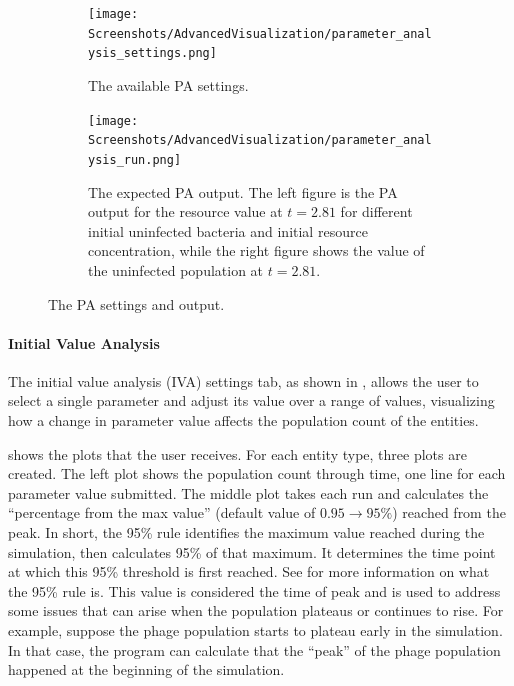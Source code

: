 \begin{figure}[h!]
    \centering
    \begin{subfigure}{0.49\linewidth}
        \centering
        \captionsetup{width=1\linewidth}
        \texttt{[image: Screenshots/AdvancedVisualization/parameter\_analysis\_settings.png]}
        \caption{
            The available PA settings. 
        }
        \label{fig:ss:av:parameter_analysis_settings}
    \end{subfigure}
    \hfill
    \begin{subfigure}{0.49\linewidth}
        \centering
        \captionsetup{width=1\linewidth}
        \texttt{[image: Screenshots/AdvancedVisualization/parameter\_analysis\_run.png]}
        \caption{
            The expected PA output. 
            The left figure is the PA output for the resource value at $t=2.81$ for different initial uninfected bacteria and initial resource concentration, while the right figure shows the value of the uninfected population at $t=2.81$. 
        }
        \label{fig:ss:av:parameter_analysis_run}
    \end{subfigure}
    \caption{The PA settings and output.}
\end{figure}

\paragraph{Initial Value Analysis}
\label{sec:initial_value_analysis}
The initial value analysis (IVA) settings tab, as shown in , allows the user to select a single parameter and adjust its value over a range of values, visualizing how a change in parameter value affects the population count of the entities.

 shows the plots that the user receives.
For each entity type, three plots are created.
The left plot shows the population count through time, one line for each parameter value submitted.
The middle plot takes each run and calculates the “percentage from the max value” (default value of $0.95 \rightarrow 95\%$) reached from the peak.
In short, the 95\% rule identifies the maximum value reached during the simulation, then calculates 95\% of that maximum. 
It determines the time point at which this 95\% threshold is first reached.
See  for more information on what the 95\% rule is. 
This value is considered the time of peak and is used to address some issues that can arise when the population plateaus or continues to rise.
For example, suppose the phage population starts to plateau early in the simulation. 
In that case, the program can calculate that the “peak” of the phage population happened at the beginning of the simulation. 

